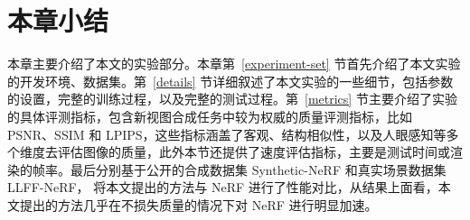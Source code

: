 \section{本章小结}
本章主要介绍了本文的实验部分。本章第~\ref{experiment-set} 节首先介绍了本文实验的开发环境、数据集。第~\ref{details} 节详细叙述了本文实验的一些细节，包括参数的设置，完整的训练过程，以及完整的测试过程。第~\ref{metrics} 节主要介绍了实验的具体评测指标，包含新视图合成任务中较为权威的质量评测指标，比如 PSNR、SSIM 和 LPIPS，这些指标涵盖了客观、结构相似性，以及人眼感知等多个维度去评估图像的质量，此外本节还提供了速度评估指标，主要是测试时间或渲染的帧率。最后分别基于公开的合成数据集 Synthetic-NeRF 和真实场景数据集 LLFF-NeRF， 将本文提出的方法与 NeRF 进行了性能对比，从结果上面看，本文提出的方法几乎在不损失质量的情况下对 NeRF 进行明显加速。





